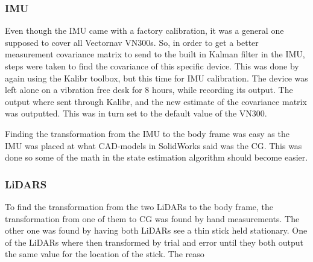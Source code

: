 \subsubsection{IMU}

Even though the IMU came with a factory calibration, it was a general one supposed to cover all Vectornav VN300s. So, in order to get a better measurement covariance matrix to send to the built in Kalman filter in the IMU, steps were taken to find the covariance of this specific device. This was done by again using the Kalibr toolbox, but this time for IMU calibration. The device was left alone on a vibration free desk for 8 hours, while recording its output. The output where sent through Kalibr, and the new estimate of the covariance matrix was outputted. This was in turn set to the default value of the VN300. 

Finding the transformation from the IMU to the body frame was easy as the IMU was placed at what CAD-models in SolidWorks said was the CG. This was done so some of the math in the state estimation algorithm should become easier.

\subsubsection{LiDARS}

To find the transformation from the two LiDARs to the body frame, the transformation from one of them to CG was found by hand measurements. The other one was found by having both LiDARs see a thin stick held stationary. One of the LiDARs where then transformed by trial and error until they both output the same value for the location of the stick. The reaso
